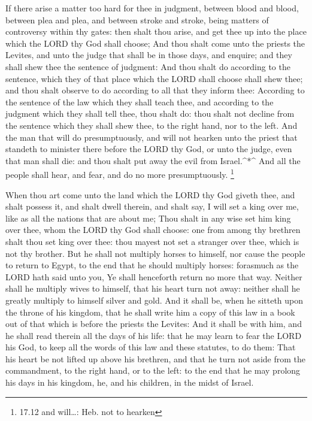  If there arise a matter too hard for thee in judgment,
between blood and blood, between plea and plea, and between stroke and
stroke, being matters of controversy within thy gates: then shalt thou
arise, and get thee up into the place which the LORD thy God shall
choose;  And thou shalt come unto the priests the Levites,
and unto the judge that shall be in those days, and enquire; and they
shall shew thee the sentence of judgment:  And thou shalt
do according to the sentence, which they of that place which the LORD
shall choose shall shew thee; and thou shalt observe to do according to
all that they inform thee:  According to the sentence of
the law which they shall teach thee, and according to the judgment which
they shall tell thee, thou shalt do: thou shalt not decline from the
sentence which they shall shew thee, to the right hand, nor to the left.
 And the man that will do presumptuously, and will not
hearken unto the priest that standeth to minister there before the LORD
thy God, or unto the judge, even that man shall die: and thou shalt put
away the evil from Israel.\^{}*\^{}  And all the people
shall hear, and fear, and do no more presumptuously. \footnote{17.12 and
  will\ldots: Heb. not to hearken}

 When thou art come unto the land which the LORD thy God
giveth thee, and shalt possess it, and shalt dwell therein, and shalt
say, I will set a king over me, like as all the nations that are about
me;  Thou shalt in any wise set him king over thee, whom
the LORD thy God shall choose: one from among thy brethren shalt thou
set king over thee: thou mayest not set a stranger over thee, which is
not thy brother.  But he shall not multiply horses to
himself, nor cause the people to return to Egypt, to the end that he
should multiply horses: forasmuch as the LORD hath said unto you, Ye
shall henceforth return no more that way.  Neither shall he
multiply wives to himself, that his heart turn not away: neither shall
he greatly multiply to himself silver and gold.  And it
shall be, when he sitteth upon the throne of his kingdom, that he shall
write him a copy of this law in a book out of that which is before the
priests the Levites:  And it shall be with him, and he
shall read therein all the days of his life: that he may learn to fear
the LORD his God, to keep all the words of this law and these statutes,
to do them:  That his heart be not lifted up above his
brethren, and that he turn not aside from the commandment, to the right
hand, or to the left: to the end that he may prolong his days in his
kingdom, he, and his children, in the midst of Israel.

